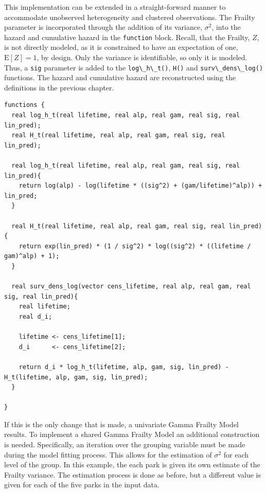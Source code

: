
This implementation can be extended in a straight-forward manner to accommodate unobserved heterogeneity and clustered observations. The Frailty parameter is incorporated through the addition of its variance, $\sigma^2$, into the hazard and cumulative hazard in the \lstinline{function} block. Recall, that the Frailty, $Z$, is not directly modeled, as it is constrained to have an expectation of one, $\mathrm{E}[Z]=1$, by design. Only the variance is identifiable, so only it is modeled. Thus, a \lstinline{sig} parameter is added to the \lstinline{log\_h\_t()}, \lstinline{H()} and \lstinline{surv\_dens\_log()} functions. The hazard and cumulative hazard are reconstructed using the definitions in the previous chapter. 

\begin{lstlisting}
functions {
  real log_h_t(real lifetime, real alp, real gam, real sig, real lin_pred);
  real H_t(real lifetime, real alp, real gam, real sig, real lin_pred);
  
  real log_h_t(real lifetime, real alp, real gam, real sig, real lin_pred){
    return log(alp) - log(lifetime * ((sig^2) + (gam/lifetime)^alp)) + lin_pred;
  }
  
  real H_t(real lifetime, real alp, real gam, real sig, real lin_pred){
    return exp(lin_pred) * (1 / sig^2) * log((sig^2) * ((lifetime / gam)^alp) + 1);
  }
  
  real surv_dens_log(vector cens_lifetime, real alp, real gam, real sig, real lin_pred){
    real lifetime;
    real d_i;
    
    lifetime <- cens_lifetime[1];
    d_i      <- cens_lifetime[2];
  
    return d_i * log_h_t(lifetime, alp, gam, sig, lin_pred) - H_t(lifetime, alp, gam, sig, lin_pred);
  }

}
\end{lstlisting}


If this is the only change that is made, a univariate Gamma Frailty Model results. To implement a shared Gamma Frailty Model an additional construction is needed. Specifically, an iteration over the grouping variable must be made during the model fitting process. This allows for the estimation of $\sigma^2$ for each level of the group. In this example, the each park is given its own estimate of the Frailty variance. The estimation process is done as before, but a different value is given for each of the five parks in the input data.

